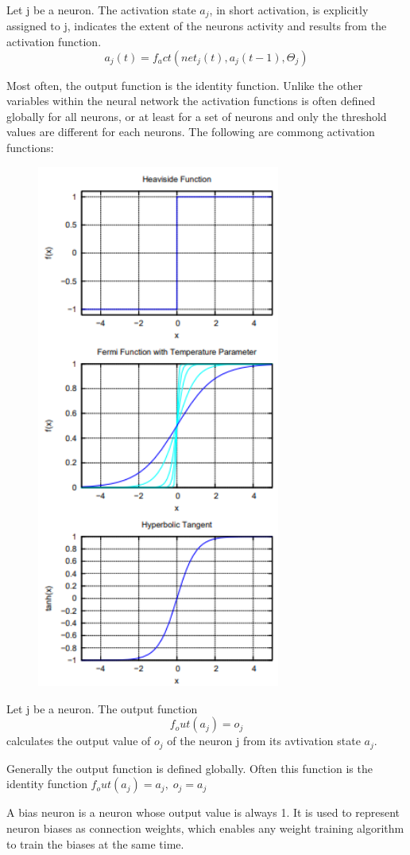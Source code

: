 \begin{definition} Let j be a neuron. The activation state $a_j$, in short activation, is explicitly assigned to j, indicates the extent of the neurons activity and results from the activation function.
    \[ 
        a_j(t) = f_act(net_j(t), a_j(t-1), \Theta_j) 
    \]
    
\end{definition}
Most often, the output function is the identity function. Unlike the other variables within the neural network the activation functions is often defined globally for all neurons, or at least for a set of neurons and only the threshold values are different for each neurons. The following are commong activation functions:
\begin{figure}[htbp]
    \centering
    \includegraphics[width=8cm]{Learning Paradigms/activation_functions.png}
\end{figure}
\newpage
\begin{definition}
    Let j be a neuron. The output function
    \[ 
        f_out(a_j)= o_j 
    \]
    calculates the output value of $o_j$ of the neuron j from its avtivation state $a_j$.
\end{definition}
    Generally the output function is defined globally. Often this function is the identity function $f_out(a_j) = a_j,\; o_j = a_j$
\begin{definition}
    A bias neuron is a neuron whose output value is always 1. It is used to represent neuron biases as connection weights, which enables any weight training algorithm to train the biases at the same time.
\end{definition}
